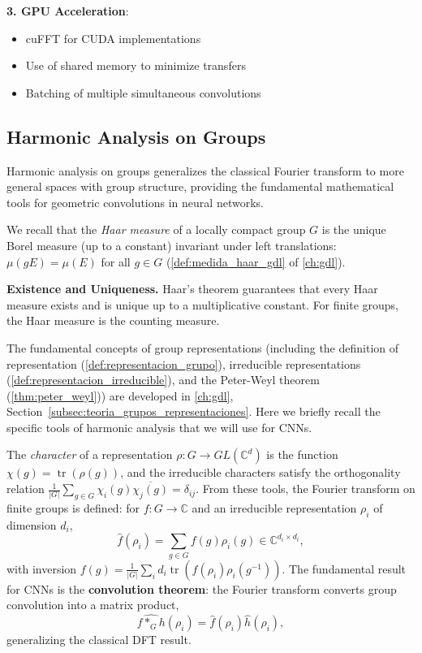 \textbf{3. GPU Acceleration}:
\begin{itemize}
    \item cuFFT for CUDA implementations
    \item Use of shared memory to minimize transfers
    \item Batching of multiple simultaneous convolutions
\end{itemize}

\subsection{Harmonic Analysis on Groups}\label{subsec:analisis_armonico_grupos}

Harmonic analysis on groups generalizes the classical Fourier transform to more general spaces with group structure, providing the fundamental mathematical tools for geometric convolutions in neural networks.

We recall that the \textit{Haar measure} of a locally compact group $G$ is the unique Borel measure (up to a constant) invariant under left translations: $\mu(gE) = \mu(E)$ for all $g \in G$ (\autoref{def:medida_haar_gdl} of \autoref{ch:gdl}).\label{def:medida_haar}

\textbf{Existence and Uniqueness.} Haar's theorem guarantees that every Haar measure exists and is unique up to a multiplicative constant. For finite groups, the Haar measure is the counting measure.

The fundamental concepts of group representations (including the definition of representation (\autoref{def:representacion_grupo}), irreducible representations (\autoref{def:representacion_irreducible}), and the Peter-Weyl theorem (\autoref{thm:peter_weyl})) are developed in \autoref{ch:gdl}, Section~\ref{subsec:teoria_grupos_representaciones}. Here we briefly recall the specific tools of harmonic analysis that we will use for CNNs.

The \textit{character} of a representation $\rho: G \to GL(\mathbb{C}^d)$ is the function $\chi(g) = \operatorname{tr}(\rho(g))$, and the irreducible characters satisfy the orthogonality relation $\frac{1}{|G|} \sum_{g \in G} \chi_i(g) \overline{\chi_j(g)} = \delta_{ij}$. From these tools, the Fourier transform on finite groups is defined: for $f: G \to \mathbb{C}$ and an irreducible representation $\rho_i$ of dimension $d_i$,
\begin{equation}\label{eq:fourier_grupo_finito}
\hat{f}(\rho_i) = \sum_{g\in G} f(g)\rho_i(g) \in \mathbb{C}^{d_i \times d_i},
\end{equation}
with inversion $f(g) = \frac{1}{|G|} \sum_i d_i \operatorname{tr}(\hat{f}(\rho_i) \rho_i(g^{-1}))$. The fundamental result for CNNs is the \textbf{convolution theorem}: the Fourier transform converts group convolution into a matrix product,
\begin{equation}\label{eq:convolucion_fourier_grupos}
\widehat{f *_G h}(\rho_i) = \hat{f}(\rho_i) \hat{h}(\rho_i),
\end{equation}
generalizing the classical DFT result.

